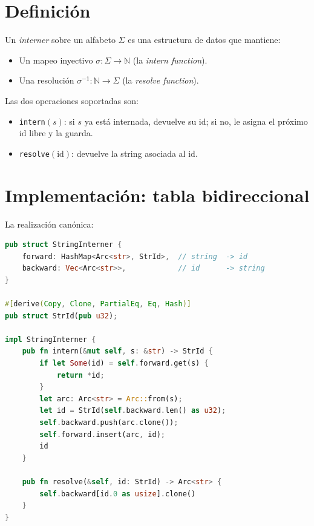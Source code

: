 \section{Definición}

\begin{definition}
Un \emph{interner} sobre un alfabeto \(\Sigma\) es una estructura de
datos que mantiene:
\begin{itemize}
    \item Un mapeo inyectivo \(\sigma \colon \Sigma \to \mathbb{N}\)
    (la \emph{intern function}).
    \item Una resolución \(\sigma^{-1} \colon \mathbb{N} \to \Sigma\)
    (la \emph{resolve function}).
\end{itemize}
Las dos operaciones soportadas son:
\begin{itemize}
    \item \texttt{intern}\((s)\): si \(s\) ya está internada, devuelve
    su \(\mathrm{id}\); si no, le asigna el próximo \(\mathrm{id}\)
    libre y la guarda.
    \item \texttt{resolve}\((\mathrm{id})\): devuelve la string
    asociada al \(\mathrm{id}\).
\end{itemize}
\end{definition}

\section{Implementación: tabla bidireccional}

La realización canónica:

\begin{lstlisting}[language=Rust]
pub struct StringInterner {
    forward: HashMap<Arc<str>, StrId>,  // string  -> id
    backward: Vec<Arc<str>>,            // id      -> string
}

#[derive(Copy, Clone, PartialEq, Eq, Hash)]
pub struct StrId(pub u32);

impl StringInterner {
    pub fn intern(&mut self, s: &str) -> StrId {
        if let Some(id) = self.forward.get(s) {
            return *id;
        }
        let arc: Arc<str> = Arc::from(s);
        let id = StrId(self.backward.len() as u32);
        self.backward.push(arc.clone());
        self.forward.insert(arc, id);
        id
    }

    pub fn resolve(&self, id: StrId) -> Arc<str> {
        self.backward[id.0 as usize].clone()
    }
}
\end{lstlisting}

